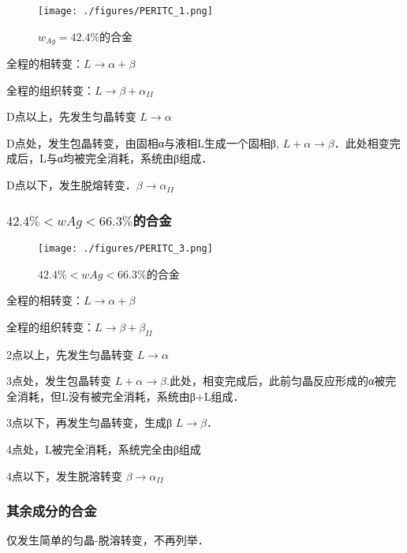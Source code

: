 \begin{figure}[ht]
\centering
\texttt{[image: ./figures/PERITC\_1.png]}
\caption{$w_{Ag}=42.4\%$的合金} \label{PERITC_fig1}
\end{figure}

全程的相转变：$L \rightarrow \alpha+\beta$

全程的组织转变：$L \rightarrow \beta + \alpha_{II}$

D点以上，先发生匀晶转变 $L \rightarrow \alpha$

D点处，发生包晶转变，由固相α与液相L生成一个固相β, $L + \alpha \rightarrow \beta$．此处相变完成后，L与α均被完全消耗，系统由β组成．


D点以下，发生脱熔转变．$\beta \rightarrow \alpha_{II}$


\subsubsection{$42.4\%<wAg<66.3\%$的合金}
\begin{figure}[ht]
\centering
\texttt{[image: ./figures/PERITC\_3.png]}
\caption{$42.4\%<wAg<66.3\%$的合金} \label{PERITC_fig3}
\end{figure}
全程的相转变：$L \rightarrow \alpha+\beta$

全程的组织转变：$L \rightarrow \beta + \beta_{II}$

2点以上，先发生匀晶转变 $L \rightarrow \alpha$

3点处，发生包晶转变 $L + \alpha \rightarrow \beta$.此处，相变完成后，此前匀晶反应形成的α被完全消耗，但L没有被完全消耗，系统由β+L组成．

3点以下，再发生匀晶转变，生成β $L \rightarrow \beta$．

4点处，L被完全消耗，系统完全由β组成

4点以下，发生脱溶转变 $\beta \rightarrow \alpha_{II}$

\subsubsection{其余成分的合金}
仅发生简单的匀晶-脱溶转变，不再列举．

